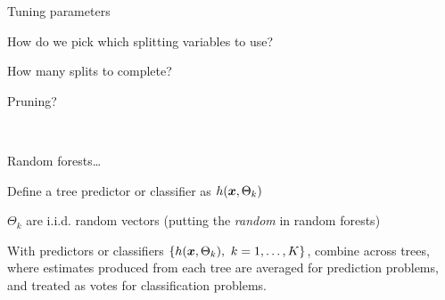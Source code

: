 \documentclass[xcolor={table}, handout]{beamer}
\begin{document}


\begin{frame}{Tuning parameters}

\begin{wideitemize}
\item How do we pick which splitting variables to use?\pause
\item How many splits to complete? \pause
\item Pruning?
\end{wideitemize}


\end{frame}



\begin{transitionframe}
\centering

\LARGE \textcolor{white}{Forests}

\end{transitionframe}

\begin{frame}{Random forests\dots}
\pause

\begin{wideitemize}
\item Define a tree predictor or classifier as $h(\bm{x}, \Theta_k)$\pause
\item ${\Theta_k}$ are i.i.d. random vectors \pause (putting the \textit{random} in random forests)\pause
\item With predictors or classifiers $\{h(\bm{x}, \Theta_k), \ k = 1, \dots, K \}$, combine across trees, where estimates produced from each tree are averaged for prediction problems, and treated as votes for classification problems. 
\end{wideitemize}

\end{frame}
\end{document}

